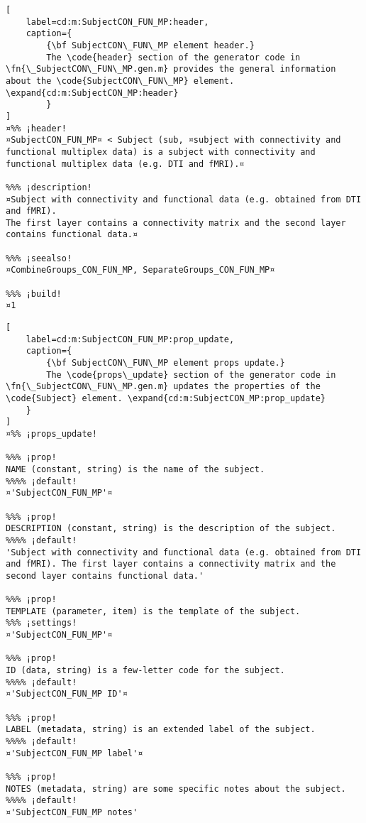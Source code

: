 \documentclass{tufte-handout}
\begin{document}
\begin{lstlisting}[
	label=cd:m:SubjectCON_FUN_MP:header,
	caption={
		{\bf SubjectCON\_FUN\_MP element header.}
		The \code{header} section of the generator code in \fn{\_SubjectCON\_FUN\_MP.gen.m} provides the general information about the \code{SubjectCON\_FUN\_MP} element. \expand{cd:m:SubjectCON_MP:header}
		}
]
¤%% ¡header!
¤SubjectCON_FUN_MP¤ < Subject (sub, ¤subject with connectivity and functional multiplex data) is a subject with connectivity and functional multiplex data (e.g. DTI and fMRI).¤

%%% ¡description!
¤Subject with connectivity and functional data (e.g. obtained from DTI and fMRI).
The first layer contains a connectivity matrix and the second layer contains functional data.¤

%%% ¡seealso!
¤CombineGroups_CON_FUN_MP, SeparateGroups_CON_FUN_MP¤

%%% ¡build!
¤1
\end{lstlisting}

\begin{lstlisting}[
	label=cd:m:SubjectCON_FUN_MP:prop_update,
	caption={
		{\bf SubjectCON\_FUN\_MP element props update.}
		The \code{props\_update} section of the generator code in \fn{\_SubjectCON\_FUN\_MP.gen.m} updates the properties of the \code{Subject} element. \expand{cd:m:SubjectCON_MP:prop_update}
	}
]
¤%% ¡props_update!

%%% ¡prop!
NAME (constant, string) is the name of the subject.
%%%% ¡default!
¤'SubjectCON_FUN_MP'¤

%%% ¡prop!
DESCRIPTION (constant, string) is the description of the subject.
%%%% ¡default!
'Subject with connectivity and functional data (e.g. obtained from DTI and fMRI). The first layer contains a connectivity matrix and the second layer contains functional data.'

%%% ¡prop!
TEMPLATE (parameter, item) is the template of the subject.
%%% ¡settings!
¤'SubjectCON_FUN_MP'¤

%%% ¡prop!
ID (data, string) is a few-letter code for the subject.
%%%% ¡default!
¤'SubjectCON_FUN_MP ID'¤

%%% ¡prop!
LABEL (metadata, string) is an extended label of the subject.
%%%% ¡default!
¤'SubjectCON_FUN_MP label'¤

%%% ¡prop!
NOTES (metadata, string) are some specific notes about the subject.
%%%% ¡default!
¤'SubjectCON_FUN_MP notes'
\end{lstlisting}
\end{document}
